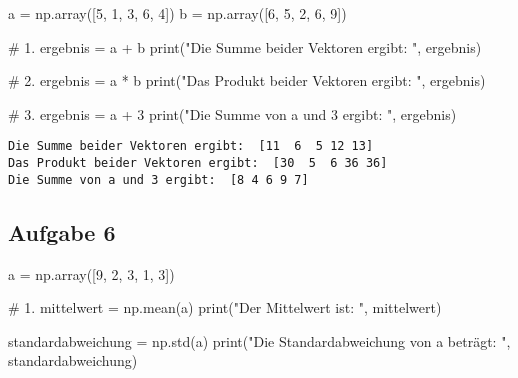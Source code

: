 \documentclass[
  letterpaper,
  DIV=11,
  numbers=noendperiod]{scrreprt}
\newenvironment{Shaded}{\begin{snugshade}}{\end{snugshade}}
\newcommand{\BuiltInTok}[1]{\textcolor[rgb]{0.00,0.23,0.31}{#1}}
\newcommand{\CommentTok}[1]{\textcolor[rgb]{0.37,0.37,0.37}{#1}}
\newcommand{\DecValTok}[1]{\textcolor[rgb]{0.68,0.00,0.00}{#1}}
\newcommand{\NormalTok}[1]{\textcolor[rgb]{0.00,0.23,0.31}{#1}}
\newcommand{\OperatorTok}[1]{\textcolor[rgb]{0.37,0.37,0.37}{#1}}
\newcommand{\StringTok}[1]{\textcolor[rgb]{0.13,0.47,0.30}{#1}}
\begin{document}
\begin{tcolorbox}
\begin{tcolorbox}
\begin{Shaded}
\begin{Highlighting}[]
\NormalTok{a }\OperatorTok{=}\NormalTok{ np.array([}\DecValTok{5}\NormalTok{, }\DecValTok{1}\NormalTok{, }\DecValTok{3}\NormalTok{, }\DecValTok{6}\NormalTok{, }\DecValTok{4}\NormalTok{])}
\NormalTok{b }\OperatorTok{=}\NormalTok{ np.array([}\DecValTok{6}\NormalTok{, }\DecValTok{5}\NormalTok{, }\DecValTok{2}\NormalTok{, }\DecValTok{6}\NormalTok{, }\DecValTok{9}\NormalTok{])}

\CommentTok{\# 1.}
\NormalTok{ergebnis }\OperatorTok{=}\NormalTok{ a }\OperatorTok{+}\NormalTok{ b}
\BuiltInTok{print}\NormalTok{(}\StringTok{"Die Summe beider Vektoren ergibt: "}\NormalTok{, ergebnis) }

\CommentTok{\# 2.}
\NormalTok{ergebnis }\OperatorTok{=}\NormalTok{ a }\OperatorTok{*}\NormalTok{ b}
\BuiltInTok{print}\NormalTok{(}\StringTok{"Das Produkt beider Vektoren ergibt: "}\NormalTok{, ergebnis) }

\CommentTok{\# 3.}
\NormalTok{ergebnis }\OperatorTok{=}\NormalTok{ a }\OperatorTok{+} \DecValTok{3}
\BuiltInTok{print}\NormalTok{(}\StringTok{"Die Summe von a und 3 ergibt: "}\NormalTok{, ergebnis) }
\end{Highlighting}
\end{Shaded}

\begin{verbatim}
Die Summe beider Vektoren ergibt:  [11  6  5 12 13]
Das Produkt beider Vektoren ergibt:  [30  5  6 36 36]
Die Summe von a und 3 ergibt:  [8 4 6 9 7]
\end{verbatim}

\subsection*{Aufgabe 6}\label{aufgabe-6-1}

\begin{Shaded}
\begin{Highlighting}[]
\NormalTok{a }\OperatorTok{=}\NormalTok{ np.array([}\DecValTok{9}\NormalTok{, }\DecValTok{2}\NormalTok{, }\DecValTok{3}\NormalTok{, }\DecValTok{1}\NormalTok{, }\DecValTok{3}\NormalTok{])}

\CommentTok{\# 1.}
\NormalTok{mittelwert }\OperatorTok{=}\NormalTok{ np.mean(a)}
\BuiltInTok{print}\NormalTok{(}\StringTok{"Der Mittelwert ist: "}\NormalTok{, mittelwert)}

\NormalTok{standardabweichung }\OperatorTok{=}\NormalTok{ np.std(a)}
\BuiltInTok{print}\NormalTok{(}\StringTok{"Die Standardabweichung von a beträgt: "}\NormalTok{, standardabweichung) }


\end{Highlighting}
\end{Shaded}
\end{tcolorbox}
\end{tcolorbox}
\end{document}
